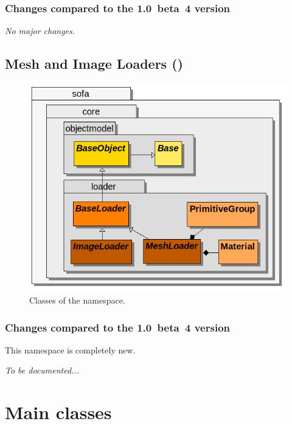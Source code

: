 \begin{itemize}
\begin{itemize}
\subsubsection{Changes compared to the 1.0~beta~4 version}

\textit{No major changes.}

\subsection{Mesh and Image Loaders ()}

\begin{figure}[h]
\centering
\includegraphics[scale=.33]{../classdiagrams/sofacore-loader.png}
\caption{Classes of the  namespace.}
\label{fig:uml-sofa-core-loader}
\end{figure}

\subsubsection{Changes compared to the 1.0~beta~4 version}

This namespace is completely new.

\textit{To be documented...}

\pagebreak

\section{Main classes}


\end{itemize}
\end{itemize}
